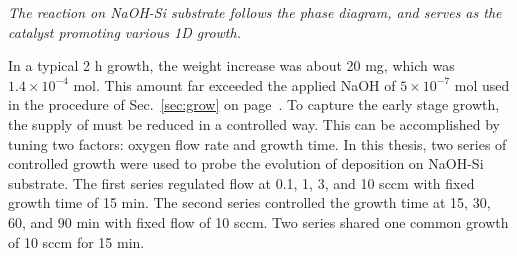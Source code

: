 \emph{The reaction on NaOH-Si substrate follows the phase diagram, and  serves as the catalyst promoting various 1D  growth.}

In a typical 2 h growth, the  weight increase was about 20 mg, which was $1.4\times 10^{-4}$ mol. This amount far exceeded the applied NaOH of $5\times 10^{-7}$ mol used in the procedure of Sec.~\ref{sec:grow} on page~\pageref{sec:grow}. To capture the early stage growth, the supply of  must be reduced in a controlled way. This can be accomplished by tuning two factors: oxygen flow rate and growth time. In this thesis, two series of controlled growth were used to probe the evolution of  deposition on NaOH-Si substrate. The first series regulated  flow at 0.1, 1, 3, and 10 sccm with fixed growth time of 15 min. The second series controlled the growth time at 15, 30, 60, and 90 min with fixed  flow of 10 sccm. Two series shared one common growth of 10 sccm  for 15 min. 

